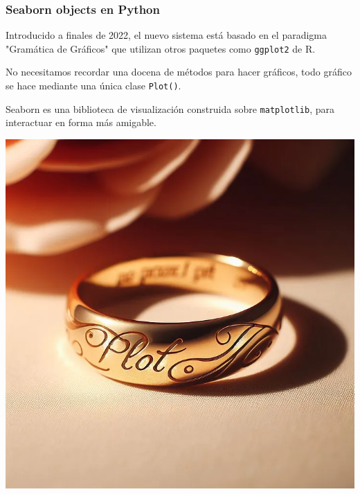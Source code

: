 \documentclass[aspectratio=169,12pt]{beamer}
\begin{document}

\begin{frame}
\frametitle{Seaborn objects en Python}

\begin{minipage}{.55\textwidth}
Introducido a finales de 2022, el nuevo sistema está basado en el paradigma "Gramática de Gráficos" que utilizan otros paquetes como \lstinline{ggplot2} de R.

No necesitamos recordar una docena de métodos para hacer gráficos, todo gráfico se hace mediante una única clase \lstinline{Plot()}.

\vspace{0.5cm}

Seaborn es una biblioteca de visualización construida sobre \lstinline{matplotlib}, para interactuar en forma más amigable.

\end{minipage} \hspace{1cm} %
\begin{minipage}{.35\textwidth}
\begin{center}
\includegraphics[scale=0.20]{PlotRing.png}
\end{center}
\end{minipage}


\end{frame}
\end{document}
